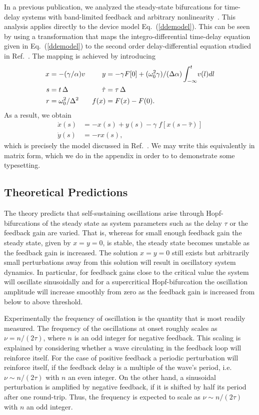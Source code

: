 \documentclass[aps,twocolumn,pre,nofootinbib]{revtex4}
\begin{document}
In a previous publication, we analyzed the steady-state bifurcations for time-delay systems with band-limited feedback and arbitrary nonlinearity~\cite{illing2005}.  This analysis applies directly to the device model Eq.~(\ref{ddemodel}). This can be seen by using a transformation that maps the integro-differential time-delay equation given in Eq.~(\ref{ddemodel}) to the second order delay-differential equation studied in  Ref.~\cite{illing2005}.
The mapping is achieved by introducing
\begin{align*}
x&= - (\gamma/\alpha) v   &  y&=-\gamma F[0] + (\omega_0^2 \gamma)/(\Delta \alpha) \int_{-\infty}^t \! v(l) dl \\
s &=  t \, \Delta                      &    \hat{\tau}& =  \tau \, \Delta  \\
 r&=\omega_0^2/\Delta^2             &  f(x)&=F(x)-F(0).
\end{align*}
 As a result, we obtain
 \begin{equation}
\label{2D_DDE}
\begin{split}
\dot{x}(s) &= -x(s) + y(s) - \gamma \; f\left[ x(s - \hat{\tau}) \right] \\
\dot{y}(s) &= -r x(s),
\end{split}
\end{equation}
which is precisely the model discussed in Ref.~\cite{illing2005}. We may write this equivalently in matrix form, which we do in the appendix in order to  to demonstrate some typesetting.

\subsection{Theoretical Predictions}

The theory predicts that self-sustaining oscillations arise through Hopf-bifurcations of the steady state as system parameters such as the delay $\tau$ or the feedback gain are varied. 
That is, whereas for small enough feedback gain the steady state, given by $x=y=0$, is stable, the steady state becomes unstable as the feedback gain is increased. The solution $x=y=0$ still exists but arbitrarily small perturbations away from this solution will result in oscillatory system dynamics. In particular, for feedback gains close to the critical value the system will oscillate sinusoidally and for a supercritical Hopf-bifurcation the oscillation amplitude will increase smoothly from zero as the feedback gain is increased from below to above threshold. 


 Experimentally the frequency of oscillation is the quantity that is most readily measured. The frequency of the oscillations at onset roughly scales as $\nu = n/(2 \tau)$, where $n$ is an odd integer for negative feedback.     
This scaling  is explained by considering whether a wave circulating in the feedback loop will reinforce itself. For the case of positive feedback a periodic perturbation will reinforce itself, if the feedback delay is a multiple of the wave's period, i.e. $\nu \sim n / (2 \tau)$ with $n$ an even integer.  On the other hand, a sinusoidal perturbation is amplified by negative feedback, if it is shifted by half its period after one round-trip. Thus, the frequency is expected to scale as $\nu \sim n / (2 \tau)$ with $n$ an odd integer. 
\end{document}
